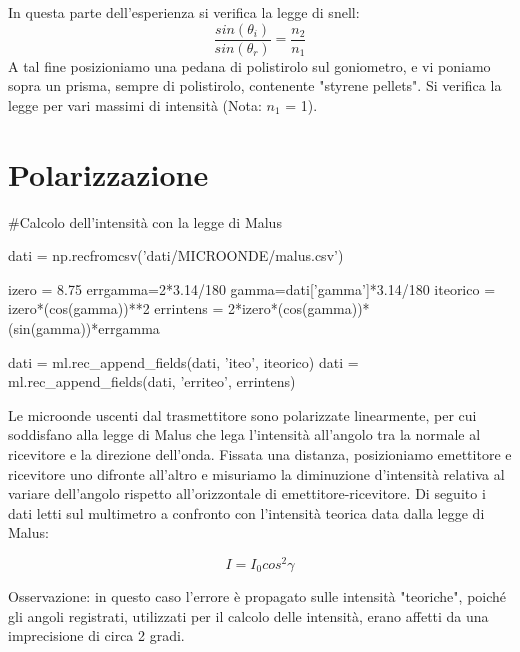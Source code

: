 In questa parte dell'esperienza si verifica la legge di snell:
\begin{equation}
\frac{sin(\theta_{i})}{sin(\theta_{r})} = \frac{n_2}{n_1}
\end{equation}
A tal fine posizioniamo una pedana di polistirolo sul goniometro, e vi poniamo sopra un prisma, sempre di polistirolo, contenente "styrene pellets". Si verifica la legge per vari massimi di intensità (Nota: $n_1$ = 1).





\section{Polarizzazione}

\begin{sagesilent}
#Calcolo dell'intensità con la legge di Malus

dati = np.recfromcsv('dati/MICROONDE/malus.csv')

izero = 8.75
errgamma=2*3.14/180
gamma=dati['gamma']*3.14/180
iteorico = izero*(cos(gamma))**2
errintens = 2*izero*(cos(gamma))*(sin(gamma))*errgamma

dati = ml.rec_append_fields(dati, 'iteo', iteorico)
dati = ml.rec_append_fields(dati, 'erriteo', errintens)

\end{sagesilent}


Le microonde uscenti dal trasmettitore sono polarizzate linearmente, per cui soddisfano alla legge di Malus che lega l'intensità all'angolo tra la normale al ricevitore e la direzione dell'onda. Fissata una distanza, posizioniamo emettitore e ricevitore uno difronte all'altro e misuriamo la diminuzione d'intensità relativa al variare dell'angolo rispetto all'orizzontale di emettitore-ricevitore. Di seguito i dati letti sul multimetro a confronto con l'intensità teorica data dalla legge di Malus:

\begin{equation}
I = I_{0} cos^2 \gamma
\end{equation}

\begin{center}
\end{center}

Osservazione: in questo caso l'errore è propagato sulle intensità "teoriche", poiché gli angoli registrati, utilizzati per il calcolo delle intensità, erano affetti da una imprecisione di circa 2 gradi.


